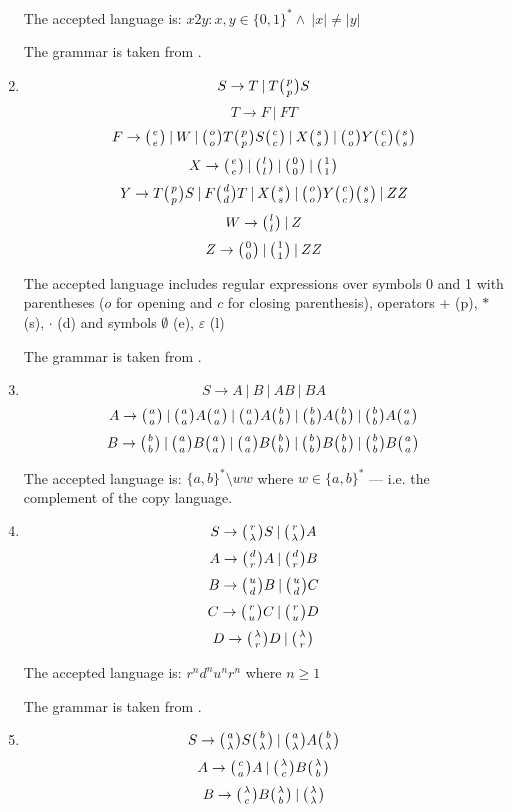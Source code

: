 \begin{enumerate}
{    The accepted language is: $x2y: x, y \in \{0,1\}^* \wedge \:|x| \neq |y|$

    The grammar is taken from \cite{GRAMMAR_9}.
  }

  \item{
    $$S \rightarrow T \:|\: T \wkpair{p}{p} S$$
    $$T \rightarrow F \:|\: F T$$
    $$F \rightarrow \wkpair{e}{e} \:|\: W \:|\: \wkpair{o}{o} T \wkpair{p}{p} S \wkpair{c}{c} \:|\: X \wkpair{s}{s} \:|\: \wkpair{o}{o} Y \wkpair{c}{c} \wkpair{s}{s}$$
    $$X \rightarrow \wkpair{e}{e} \:|\: \wkpair{l}{l} \:|\: \wkpair{0}{0} \:|\: \wkpair{1}{1}$$
    $$Y \rightarrow T \wkpair{p}{p} S \:|\: F \wkpair{d}{d} T \:|\: X \wkpair{s}{s} \:|\: \wkpair{o}{o} Y \wkpair{c}{c} \wkpair{s}{s} \:|\: Z Z$$
    $$W \rightarrow \wkpair{l}{l} \:|\: Z$$
    $$Z \rightarrow \wkpair{0}{0} \:|\: \wkpair{1}{1} \:|\: Z Z$$

    The accepted language includes regular expressions over symbols 0 and 1 with parentheses ($o$ for opening and $c$ for closing parenthesis), operators $+$ (p), $*$ (s), $\cdot$ (d) and symbols $\emptyset$ (e), $\varepsilon$ (l)

    The grammar is taken from \cite{GRAMMAR_10}.
  }

  \item{
    $$S \rightarrow A \:|\: B \:|\: A B \:|\: B A$$
    $$A \rightarrow \wkpair{a}{a} \:|\: \wkpair{a}{a} A \wkpair{a}{a} \:|\: \wkpair{a}{a} A \wkpair{b}{b} \:|\: \wkpair{b}{b} A \wkpair{b}{b} \:|\: \wkpair{b}{b} A \wkpair{a}{a}$$
    $$B \rightarrow \wkpair{b}{b} \:|\: \wkpair{a}{a} B \wkpair{a}{a} \:|\: \wkpair{a}{a} B \wkpair{b}{b} \:|\: \wkpair{b}{b} B \wkpair{b}{b} \:|\: \wkpair{b}{b} B \wkpair{a}{a}$$

    The accepted language is: $\{a, b\}^* \setminus ww$ where $w \in \{a, b\}^*$ --- i.e. the complement of the copy language.
  }

  \item{
    $$S \rightarrow \wkpair{r}{\lambda} S \:|\: \wkpair{r}{\lambda} A$$
    $$A \rightarrow \wkpair{d}{r} A \:|\: \wkpair{d}{r} B$$
    $$B \rightarrow \wkpair{u}{d} B \:|\: \wkpair{u}{d} C$$
    $$C \rightarrow \wkpair{r}{u} C \:|\: \wkpair{r}{u} D$$
    $$D \rightarrow \wkpair{\lambda}{r} D \:|\: \wkpair{\lambda}{r}$$

    The accepted language is: $r^nd^nu^nr^n$ where $n \geq 1$

    The grammar is taken from \cite{REG_GRAMMAR}.
  }

  \item{
    $$S \rightarrow \wkpair{a}{\lambda} S \wkpair{b}{\lambda} \:|\: \wkpair{a}{\lambda} A \wkpair{b}{\lambda}$$
    $$A \rightarrow \wkpair{c}{a} A \:|\: \wkpair{\lambda}{c} B \wkpair{\lambda}{b}$$
    $$B \rightarrow \wkpair{\lambda}{c} B \wkpair{\lambda}{b} \:|\: \wkpair{\lambda}{\lambda}$$

}
\end{enumerate}
